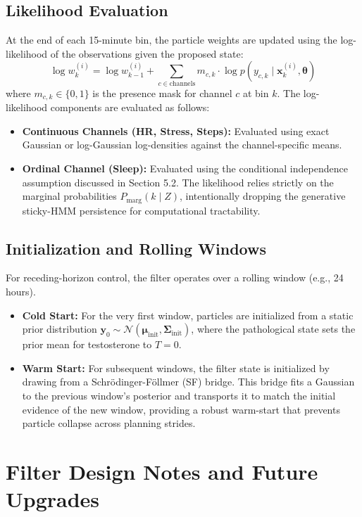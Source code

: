 \documentclass[11pt,a4paper]{article}
\begin{document}
\subsection{Likelihood Evaluation}
At the end of each 15-minute bin, the particle weights are updated using the log-likelihood of the observations given the proposed state:
\[
\log w_k^{(i)} = \log w_{k-1}^{(i)} + \sum_{c \in \text{channels}} m_{c,k} \cdot \log p(y_{c,k} \mid \mathbf{x}_k^{(i)}, \boldsymbol{\theta})
\]
where $m_{c,k} \in \{0, 1\}$ is the presence mask for channel $c$ at bin $k$. The log-likelihood components are evaluated as follows:
\begin{itemize}
    \item \textbf{Continuous Channels (HR, Stress, Steps):} Evaluated using exact Gaussian or log-Gaussian log-densities against the channel-specific means.
    \item \textbf{Ordinal Channel (Sleep):} Evaluated using the conditional independence assumption discussed in Section 5.2. The likelihood relies strictly on the marginal probabilities $P_{\text{marg}}(k \mid Z)$, intentionally dropping the generative sticky-HMM persistence for computational tractability.
\end{itemize}

\subsection{Initialization and Rolling Windows}
For receding-horizon control, the filter operates over a rolling window (e.g., 24 hours). 
\begin{itemize}
    \item \textbf{Cold Start:} For the very first window, particles are initialized from a static prior distribution $\mathbf{y}_0 \sim \mathcal{N}(\boldsymbol{\mu}_{\text{init}}, \boldsymbol{\Sigma}_{\text{init}})$, where the pathological state sets the prior mean for testosterone to $T=0$.
    \item \textbf{Warm Start:} For subsequent windows, the filter state is initialized by drawing from a Schr\"odinger-F\"ollmer (SF) bridge. This bridge fits a Gaussian to the previous window's posterior and transports it to match the initial evidence of the new window, providing a robust warm-start that prevents particle collapse across planning strides.
\end{itemize}

\section{Filter Design Notes and Future Upgrades}\label{sec:filter-upgrades}
\end{document}
